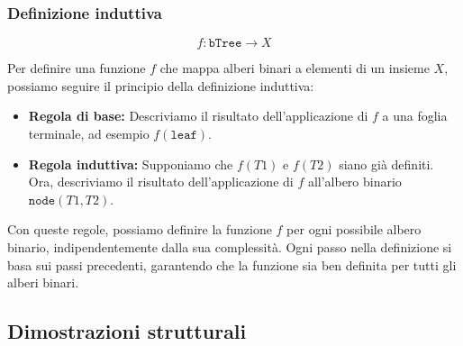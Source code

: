 \subsubsection{Definizione induttiva}
\[
f: \texttt{bTree} \rightarrow X  
\]

Per definire una funzione $f$ che mappa alberi binari a elementi di un insieme $X$, possiamo seguire il principio della definizione induttiva:

\begin{itemize}
  \item \textbf{Regola di base:} Descriviamo il risultato dell'applicazione di $f$ a una foglia terminale, ad esempio $f(\texttt{leaf})$.

  \item \textbf{Regola induttiva:} Supponiamo che $f(T1)$ e $f(T2)$ siano già definiti. Ora, descriviamo il risultato dell'applicazione di
  $f$ all'albero binario $\texttt{node}(T1, T2)$.
\end{itemize}

Con queste regole, possiamo definire la funzione $f$ per ogni possibile albero binario, indipendentemente dalla sua complessità. Ogni passo nella definizione
si basa sui passi precedenti, garantendo che la funzione sia ben definita per tutti gli alberi binari.

\subsection{Dimostrazioni strutturali}
